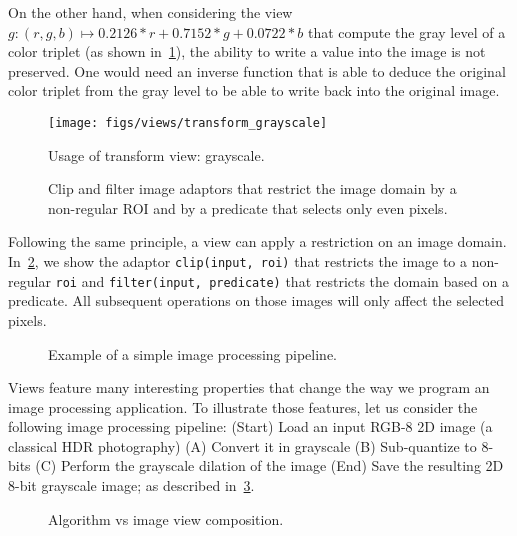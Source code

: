 On the other hand, when considering the view $g: (r,g,b) \mapsto 0.2126*r+0.7152*g+0.0722*b$ that compute the gray level
of a color triplet (as shown in~\cref{fig.view.grayscale}), the ability to write a value into the image is not
preserved. One would need an inverse function that is able to deduce the original color triplet from the gray level to
be able to write back into the original image.

\begin{figure}[tbh]
  \centering
  \texttt{[image: figs/views/transform\_grayscale]}
  \caption{Usage of transform view: grayscale.}
  \label{fig.view.grayscale}
\end{figure}

\begin{figure}[tbh]
  

  
  \caption{Clip and filter image adaptors that restrict the image domain by a non-regular ROI and by a predicate that
    selects only even pixels.}
  \label{fig.view.clip}
\end{figure}

Following the same principle, a view can apply a restriction on an image domain. In~\cref{fig.view.clip}, we show the
adaptor \texttt{clip(input, roi)} that restricts the image to a non-regular \texttt{roi} and \texttt{filter(input,
  predicate)} that restricts the domain based on a predicate. All subsequent operations on those images will only affect
the selected pixels.

\begin{figure}[tbh]
  
  \caption{Example of a simple image processing pipeline.}
  \label{fig.view.pipeline}
\end{figure}

Views feature many interesting properties that change the way we program an image processing application. To illustrate
those features, let us consider the following image processing pipeline: (Start) Load an input RGB-8 2D image (a
classical HDR photography) (A) Convert it in grayscale (B) Sub-quantize to 8-bits (C) Perform the grayscale dilation of
the image (End) Save the resulting 2D 8-bit grayscale image; as described in~\cref{fig.view.pipeline}.


\begin{figure}[tbh]
  \begin{minipage}{\linewidth}
    
  \end{minipage}
  \caption{Algorithm vs image view composition.}
  \label{fig.view.comp}
\end{figure}

